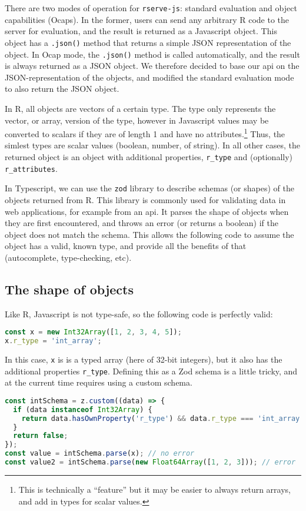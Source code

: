 \documentclass{article}
\newcommand{\pkg}[1]{\texttt{#1}}
\newcommand{\cmd}[1]{\texttt{#1}}
\newcommand{\prog}[1]{{\sf #1}}
\newcommand{\R}{\prog{R}}
\begin{document}
There are two modes of operation for \pkg{rserve-js}: standard evaluation and object capabilities (Ocaps).
In the former, users can send any arbitrary \R{} code to the server for evaluation, and the result is returned as a Javascript object.
This object has a \cmd{.json()} method that returns a simple JSON representation of the object.
In Ocap mode, the \cmd{.json()} method is called automatically, and the result is always returned as a JSON object.
We therefore decided to base our \gls{api} on the JSON-representation of the objects, and modified the standard evaluation mode to also return the JSON object.

In \R{}, all objects are vectors of a certain type.
The type only represents the vector, or array, version of the type, however in Javascript values may be converted to scalars if they are of length 1 and have no attributes.\footnote{This is technically a ``feature'' but it may be easier to always return arrays, and add in types for scalar values.}
Thus, the simlest types are scalar values (boolean, number, of string).
In all other cases, the returned object is an object with additional properties, \cmd{r\_type} and (optionally) \cmd{r\_attributes}.

In Typescript, we can use the \pkg{zod} library to describe schemas (or shapes) of the objects returned from \R{}.
This library is commonly used for validating data in web applications, for example from an \gls{api}.
It parses the shape of objects when they are first encountered, and throws an error (or returns a boolean) if the object does not match the schema.
This allows the following code to assume the object has a valid, known type, and provide all the benefits of that (autocomplete, type-checking, etc).

\subsection{The shape of objects}

Like \R{}, Javascript is not type-safe, so the following code is perfectly valid:
\begin{lstlisting}[language=Javascript,numbers=none]
const x = new Int32Array([1, 2, 3, 4, 5]);
x.r_type = 'int_array';
\end{lstlisting}
In this case, \cmd{x} is is a typed array (here of 32-bit integers), but it also has the additional properties \cmd{r\_type}.
Defining this as a Zod schema is a little tricky, and at the current time requires using a custom schema.
\begin{lstlisting}[language=Javascript,numbers=none]
const intSchema = z.custom((data) => {
  if (data instanceof Int32Array) {
    return data.hasOwnProperty('r_type') && data.r_type === 'int_array';
  }
  return false;
});
const value = intSchema.parse(x); // no error
const value2 = intSchema.parse(new Float64Array([1, 2, 3])); // error
\end{lstlisting}
\end{document}
